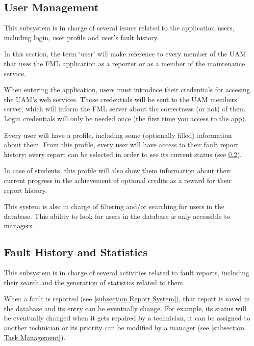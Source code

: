 \subsection{User Management}
\label{subsection User Management}

This subsystem is in charge of several issues related to the application users, including login, user profile and user's fault history.

In this section, the term `user' will make reference to every member of the UAM that uses the FML application as a reporter or as a member of the maintenance service.

When entering the application, users must introduce their credentials for accesing the UAM's web services. Those credentials will be sent to the UAM members server, which will inform the FML server about the correctness (or not) of them. Login credentials will only be needed once (the first time you access to the app).

Every user will have a profile, including some (optionally filled) information about them. From this profile, every user will have access to their fault report history; every report can be selected in order to see its current status (see \ref{subsection Fault History and Statistics}). 

In case of students, this profile will also show them information about their current progress in the achievement of optional credits as a reward for their report history.

This system is also in charge of filtering and/or searching for users in the database. This ability to look for users in the database is only accessible to managers.

\subsection{Fault History and Statistics}
\label{subsection Fault History and Statistics}

This subsystem is in charge of several activities related to fault reports, including their search and the generation of statistics related to them.

When a fault is reported (see \ref{subsection Report System}), that report is saved in the database and its entry can be eventually change. For example, its status will be eventually changed when it gets repaired by a technician, it can be assigned to another technician or its priority can be modified by a manager (see \ref{subsection Task Management}).

